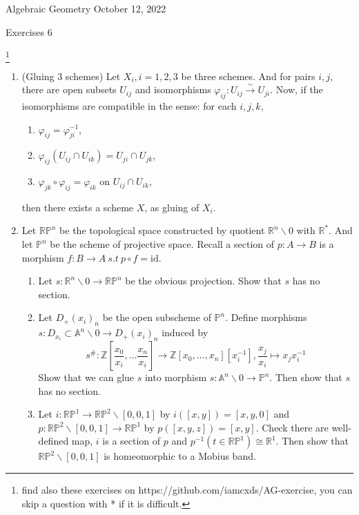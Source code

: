 \documentclass[a4paper,11pt]{article}
\def\bb#1{\mathbb{#1}}
\def\bZ{\mathbb{Z}}
\def\mrm#1{\mathrm{#1}}
\begin{document}
{\small Algebraic Geometry \hfill October 12, 2022 \\}
\begin{center}
\Huge Exercises 6
\end{center}

\vskip0.6cm
\footnote{find also these exercises on https://github.com/iamcxds/AG-exercise, you can skip a question with * if it is difficult.}

\begin{enumerate}[1.]
\item (Gluing 3 schemes) Let $X_i, i=1,2,3$ be three schemes. And for pairs $i,j$, there are open subsets $U_{ij}$ and isomorphisms $\varphi_{ij}:U_{ij}\overset {\sim }{\to} U_{ji}$. Now, if the isomorphisms are compatible in the sense: for each $i,j,k$,
\begin{enumerate}[(1)]
    \item $\varphi_{ij}=\varphi_{ji}^{-1}$,
    \item $\varphi_{ij}(U_{ij}\cap U_{ik})=U_{ji}\cap U_{jk}$,
    \item $\varphi_{jk}\circ \varphi_{ij}=\varphi_{ik}$ on $U_{ij}\cap U_{ik}$,
\end{enumerate}
then there exists a scheme $X$, as gluing of $X_i$.
\item Let $\bb{R}\bb{P}^n$ be the topological space constructed by quotient $\bb{R}^n\backslash 0$ with $\bb{R}^*$. And let $\bb{P}^n$ be the scheme of projective space. Recall a section of $p:A\to B$ is a morphism $f:B\to A \ s.t \ p\circ f =\mrm{id}$.
\begin{enumerate}
    \item Let $s:\bb{R}^n\backslash 0 \to \bb{R}\bb{P}^n$ be the obvious projection. Show that $s$ has no section.
    \item Let $D_+(x_i)_n$ be the open subscheme of $\bb{P}^n$. Define  morphisms $s: D_{x_i}\subset \bb{A}^n\backslash 0 \to D_+(x_i)_n$ induced by 
    \[ s^\#: \bZ[\frac{x_0}{x_i},\ldots \frac{x_n}{x_i}]\to \bZ[x_0,\ldots,x_n][x_i^{-1}],  \frac{x_j}{x_i} \mapsto x_jx_i^{-1}\]
    Show that we can glue $s$ into morphism $s: \bb{A}^n\backslash 0 \to \bb{P}^n$. Then show that $s$ has no section.
    \item Let $i:\bb{R}\bb{P}^1\to \bb{R}\bb{P}^2\backslash[0,0,1] $ by $i([x,y])=[x,y,0]$ and
    \\ $p:\bb{R}\bb{P}^2\backslash[0,0,1]\to\bb{R}\bb{P}^1$ by $p([x,y,z])=[x,y]$. Check there are well-defined map, $i$ is a section of $p$ and $p^{-1}(t\in \bb{R}\bb{P}^1)\cong \bb{R}^1$. Then show that $\bb{R}\bb{P}^2\backslash[0,0,1]$ is homeomorphic to a Mobius band.

\end{enumerate}
\end{enumerate}
\end{document}
